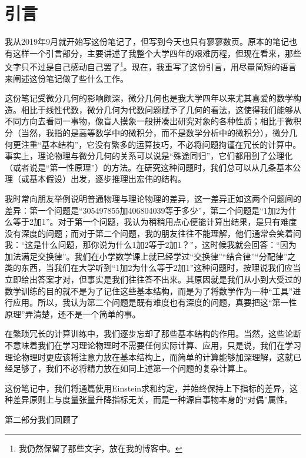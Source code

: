 \part{引言}
    我从2019年9月就开始写这份笔记了，但写到今天也只有寥寥数页。原本的笔记也有这样一个引言部分，主要讲述了我整个大学四年的艰难历程，但现在看来，那些文字只不过是自己感动自己罢了\footnote{我仍然保留了那些文字，放在我的博客中。}。现在，我重写了这份引言，用尽量简短的语言来阐述这份笔记做了些什么工作。
	
    这份笔记受微分几何的影响颇深，微分几何也是我大学四年以来尤其喜爱的数学构造。相比于线性代数，微分几何为代数问题赋予了几何的看法，这使得我们能够从不同方向去看同一事物，像盲人摸象一般拼凑出研究对象的各种性质；相比于微积分（当然，我指的是高等数学中的微积分，而不是数学分析中的微积分），微分几何更注重“基本结构”，它没有繁多的运算技巧，不必将问题拘谨在冗长的计算中。事实上，理论物理与微分几何的关系可以说是“殊途同归”，它们都用到了公理化（或者说是“第一性原理”）的方法。在研究这种问题时，我们总可以从几条基本公理（或基本假设）出发，逐步推理出宏伟的结构。
		
    我时常向朋友举例说明普通物理与理论物理的差异，这一差异正如这两个问题间的差异：第一个问题是“305497855加406804039等于多少”，第二个问题是“1加2为什么等于2加1”。对于第一个问题，我认为稍稍用点心便能计算出结果，是只有难度没有深度的问题；而对于第二个问题，我的朋友往往不能理解，他们通常会笑着问我：“这是什么问题，那你说为什么1加2等于2加1？”，这时候我就会回答：“因为加法满足交换律”。我们在小学数学课上就已经学过“交换律”“结合律”“分配律”之类的东西，当我们在大学听到“1加2为什么等于2加1”这种问题时，按理说我们应当立即给出答案才对，但事实是我们往往答不出来。其原因就是我们从小到大受过的数学训练的目的就不是为了记住这些基本结构，而是为了将数学作为一种“工具”进行应用。所以，我认为第二个问题是既有难度也有深度的问题，真要把这“第一性原理”弄清楚，还不是一个简单的事。
		
    在繁琐冗长的计算训练中，我们逐步忘却了那些基本结构的作用。当然，这些论断不意味着我们在学习理论物理时不需要任何实际计算、应用，只是说，我们在学习理论物理时更应该将注意力放在基本结构上，而简单的计算能够加深理解，这就已经足够了，我们不必将精力放在如同上述第一个问题的复杂计算上。

    这份笔记中，我们将通篇使用Einstein求和约定，并始终保持上下指标的差异，这种差异原则上与度量张量升降指标无关，而是一种源自事物本身的“对偶”属性。

    第二部分我们回顾了